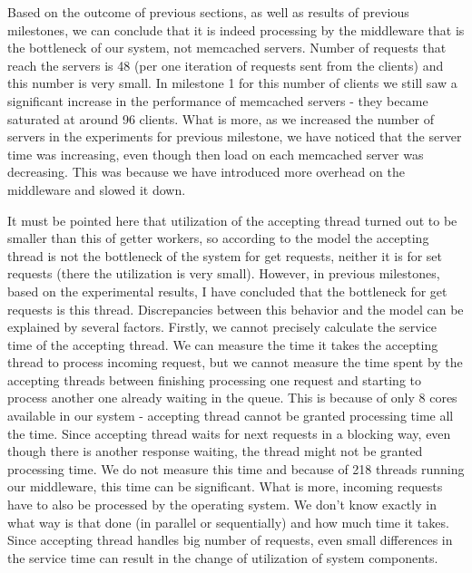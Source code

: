 \documentclass[11pt]{article}
\begin{document}
Based on the outcome of previous sections, as well as results of previous milestones, we can conclude that it is indeed processing by the middleware that is the bottleneck of our system, not memcached servers. Number of requests that reach the servers is 48 (per one iteration of requests sent from the clients) and this number is very small. In milestone 1 for this number of clients we still saw a significant increase in the performance of memcached servers - they became saturated at around 96 clients. What is more, as we increased the number of servers in the experiments for previous milestone, we have noticed that the server time was increasing, even though then load on each memcached server was decreasing. This was because we have introduced more overhead on the middleware and slowed it down.

It must be pointed here that utilization of the accepting thread turned out to be smaller than this of getter workers, so according to the model the accepting thread is not the bottleneck of the system for get requests, neither it is for set requests (there the utilization is very small). However, in previous milestones, based on the experimental results, I have concluded that the bottleneck for get requests is this thread. 
Discrepancies between this behavior and the model can be explained by several factors. Firstly, we cannot precisely calculate the service time of the accepting thread. We can measure the time it takes the accepting thread to process incoming request, but we cannot measure the time spent by the accepting threads between finishing processing one request and starting to process another one already waiting in the queue. This is because of only 8 cores available in our system - accepting thread cannot be granted processing time all the time. Since accepting thread waits for next requests in a blocking way, even though there is another response waiting, the thread might not be granted processing time. We do not measure this time and because of 218 threads running our middleware, this time can be significant. What is more, incoming requests have to also be processed by the operating system. We don't know exactly in what way is that done (in parallel or sequentially) and how much time it takes. Since accepting thread handles big number of requests, even small differences in the service time can result in the change of utilization of system components. 
\end{document}

